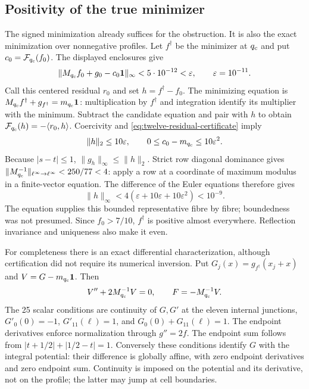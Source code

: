 \documentclass[11pt,reqno]{amsart}
\numberwithin{equation}{section}
\newcommand{\one}{\mathbf1}
\begin{document}
\subsection{Positivity of the true minimizer}

The signed minimization already suffices for the obstruction.
It is also the exact minimization over nonnegative profiles.
Let $f^\dagger$ be the minimizer at $q_{\rm c}$ and put
$c_0=\mathcal F_{q_{\rm c}}(f_0)$. The displayed enclosures give
\[
 \|M_{q_{\rm c}}f_0+g_0-c_0\one\|_\infty
 <5\cdot10^{-12}<\varepsilon,\qquad\varepsilon=10^{-11}.
\]
Call this centered residual $r_0$ and set $h=f^\dagger-f_0$.
The minimizing equation is
$M_{q_{\rm c}}f^\dagger+g_{f^\dagger}=m_{q_{\rm c}}\one$:
multiplication by $f^\dagger$ and integration identify its
multiplier with the minimum. Subtract the candidate equation
and pair with $h$ to obtain
$\mathcal F_{q_{\rm c}}(h)=-\langle r_0,h\rangle$.
Coercivity and \eqref{eq:twelve-residual-certificate} imply
\[
 \|h\|_2\le10\varepsilon,\qquad
 0\le c_0-m_{q_{\rm c}}\le10\varepsilon^2.
\]
Because $|s-t|\le1$, $\|g_h\|_\infty\le\|h\|_2$.
Strict row diagonal dominance gives
$\|M_{q_{\rm c}}^{-1}\|_{\ell^\infty\to\ell^\infty}
 <250/77<4$: apply a row at a coordinate of maximum modulus
in a finite-vector equation. The difference of the Euler
equations therefore gives
\[
 \|h\|_\infty<
 4(\varepsilon+10\varepsilon+10\varepsilon^2)<10^{-9}.
\]
The equation supplies this bounded representative fibre by fibre;
boundedness was not presumed. Since $f_0>7/10$,
$f^\dagger$ is positive almost everywhere.
Reflection invariance and uniqueness also make it even.

For completeness there is an exact differential characterization,
although certification did not require its numerical inversion.
Put $G_j(x)=g_{f^\dagger}(x_j+x)$ and
$V=G-m_{q_{\rm c}}\one$. Then
\[
 V''+2M_{q_{\rm c}}^{-1}V=0,\qquad
 F=-M_{q_{\rm c}}^{-1}V.
\]
The 25 scalar conditions are continuity of $G,G'$ at the eleven
internal junctions, $G'_0(0)=-1$, $G'_{11}(\ell)=1$, and
$G_0(0)+G_{11}(\ell)=1$.
The endpoint derivatives enforce normalization through $g''=2f$.
The endpoint sum follows from
$|t+1/2|+|1/2-t|=1$.
Conversely these conditions identify $G$ with the integral
potential: their difference is globally affine, with zero
endpoint derivatives and zero endpoint sum.
Continuity is imposed on the potential and its derivative,
not on the profile; the latter may jump at cell boundaries.
\end{document}

